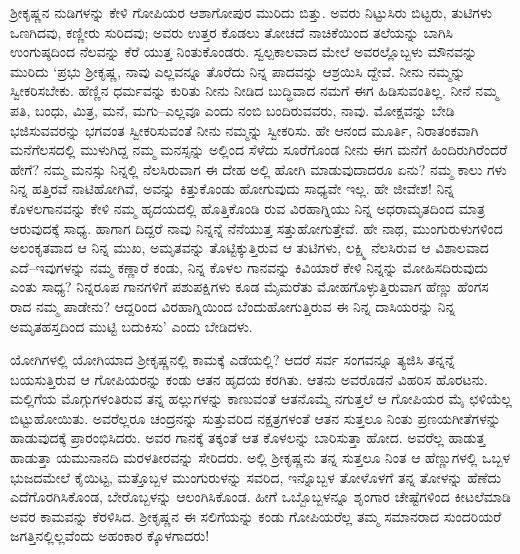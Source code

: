 ಶ್ರೀಕೃಷ್ಣನ ನುಡಿಗಳನ್ನು ಕೇಳಿ ಗೋಪಿಯರ ಆಶಾಗೋಪುರ ಮುರಿದು ಬಿತ್ತು. ಅವರು ನಿಟ್ಟುಸಿರು ಬಿಟ್ಟರು, ತುಟಿಗಳು ಒಣಗಿದವು, ಕಣ್ಣೀರು ಸುರಿದವು; ಅವರು ಉತ್ತರ ಕೊಡಲು ತೋಚದೆ ನಾಚಿಕೆಯಿಂದ ತಲೆಯನ್ನು ಬಾಗಿಸಿ ಉಂಗುಷ್ಠದಿಂದ ನೆಲವನ್ನು ಕೆರೆ ಯುತ್ತ ನಿಂತುಕೊಂಡರು. ಸ್ವಲ್ಪಕಾಲವಾದ ಮೇಲೆ ಅವರಲ್ಲೊಬ್ಬಳು ಮೌನವನ್ನು ಮುರಿದು ‘ಪ್ರಭು ಶ್ರೀಕೃಷ್ಣ, ನಾವು ಎಲ್ಲವನ್ನೂ ತೊರೆದು ನಿನ್ನ ಪಾದವನ್ನು ಆಶ್ರಯಿಸಿ ದ್ದೇವೆ. ನೀನು ನಮ್ಮನ್ನು ಸ್ವೀಕರಿಸಬೇಕು. ಹೆಣ್ಣಿನ ಧರ್ಮವನ್ನು ಕುರಿತು ನೀನು ನೀಡಿದ ಬುದ್ಧಿವಾದ ನಮಗೆ ಈಗ ಹಿಡಿಸುವಂತಿಲ್ಲ. ನೀನೆ ನಮ್ಮ ಪತಿ, ಬಂಧು, ಮಿತ್ರ, ಮನೆ, ಮಗು–ಎಲ್ಲವೂ ಎಂದು ನಂಬಿ ಬಂದಿರುವವರು, ನಾವು. ಮೋಕ್ಷವನ್ನು ಬೇಡಿ ಭಜಿಸುವವರನ್ನು ಭಗವಂತ ಸ್ವೀಕರಿಸುವಂತೆ ನೀನು ನಮ್ಮನ್ನು ಸ್ವೀಕರಿಸು. ಹೇ ಆನಂದ ಮೂರ್ತಿ, ನಿರಾತಂಕವಾಗಿ ಮನೆಗೆಲಸದಲ್ಲಿ ಮುಳುಗಿದ್ದ ನಮ್ಮ ಮನಸ್ಸನ್ನು ಅಲ್ಲಿಂದ ಸೆಳೆದು ಸೂರೆಗೊಂಡ ನೀನು ಈಗ ಮನೆಗೆ ಹಿಂದಿರುಗಿರೆಂದರೆ ಹೇಗೆ? ನಮ್ಮ ಮನಸ್ಸು ನಿನ್ನಲ್ಲಿ ನೆಲಸಿರುವಾಗ ಈ ದೇಹ ಅಲ್ಲಿ ಹೋಗಿ ಮಾಡುವುದಾದರೂ ಏನು? ನಮ್ಮ ಕಾಲು ಗಳು ನಿನ್ನ ಹತ್ತಿರವೆ ನಾಟಿಹೋಗಿವೆ, ಅವನ್ನು ಕಿತ್ತುಕೊಂಡು ಹೋಗುವುದು ಸಾಧ್ಯವೇ ಇಲ್ಲ. ಹೇ ಜೀವೇಶ! ನಿನ್ನ ಕೊಳಲಗಾನವನ್ನು ಕೇಳಿ ನಮ್ಮ ಹೃದಯದಲ್ಲಿ ಹೊತ್ತಿಕೊಂಡಿ ರುವ ವಿರಹಾಗ್ನಿಯು ನಿನ್ನ ಅಧರಾಮೃತದಿಂದ ಮಾತ್ರ ಆರುವುದಕ್ಕೆ ಸಾಧ್ಯ. ಹಾಗಾಗ ದಿದ್ದರೆ ನಾವು ನಿನ್ನನ್ನೆ ನೆನೆಯುತ್ತ ಸತ್ತುಹೋಗುತ್ತೇವೆ. ಹೇ ನಾಥ, ಮುಂಗುರುಳುಗಳಿಂದ ಅಲಂಕೃತವಾದ ಆ ನಿನ್ನ ಮುಖ, ಅಮೃತವನ್ನು ತೊಟ್ಟಿಕ್ಕುತ್ತಿರುವ ಆ ತುಟಿಗಳು, ಲಕ್ಷ್ಮಿ ನೆಲಸಿರುವ ಆ ವಿಶಾಲವಾದ ಎದೆ–ಇವುಗಳನ್ನು ನಮ್ಮ ಕಣ್ಣಾರೆ ಕಂಡು, ನಿನ್ನ ಕೊಳಲ ಗಾನವನ್ನು ಕಿವಿಯಾರೆ ಕೇಳಿ ನಿನ್ನನ್ನು ಮೋಹಿಸದಿರುವುದು ಎಂತು ಸಾಧ್ಯ? ನಿನ್ನರೂಪ ಗಾನಗಳಿಗೆ ಪಶುಪಕ್ಷಿಗಳು ಕೂಡ ಮೈಮರೆತು ಮೋಹಗೊಳ್ಳುತ್ತಿರುವಾಗ ಹೆಣ್ಣು ಹೆಂಗಸ ರಾದ ನಮ್ಮ ಪಾಡೇನು? ಆದ್ದರಿಂದ ವಿರಹಾಗ್ನಿಯಿಂದ ಬೆಂದುಹೋಗುತ್ತಿರುವ ಈ ನಿನ್ನ ದಾಸಿಯರನ್ನು ನಿನ್ನ ಅಮೃತಹಸ್ತದಿಂದ ಮುಟ್ಟಿ ಬದುಕಿಸು’ ಎಂದು ಬೇಡಿದಳು.

ಯೋಗಿಗಳಲ್ಲಿ ಯೋಗಿಯಾದ ಶ್ರೀಕೃಷ್ಣನಲ್ಲಿ ಕಾಮಕ್ಕೆ ಎಡೆಯಲ್ಲಿ? ಆದರೆ ಸರ್ವ ಸಂಗವನ್ನೂ ತ್ಯಜಿಸಿ ತನ್ನನ್ನೆ ಬಯಸುತ್ತಿರುವ ಆ ಗೋಪಿಯರನ್ನು ಕಂಡು ಆತನ ಹೃದಯ ಕರಗಿತು. ಆತನು ಅವರೊಡನೆ ವಿಹರಿಸ ಹೊರಟನು. ಮಲ್ಲಿಗೆಯ ಮೊಗ್ಗುಗಳಂತಿರುವ ತನ್ನ ಹಲ್ಲುಗಳನ್ನು ಕಾಣುವಂತೆ ಆತನೊಮ್ಮೆ ನಗುತ್ತಲೆ ಆ ಗೋಪಿಯರ ಮೈ ಛಳಿಯೆಲ್ಲ ಬಿಟ್ಟುಹೋಯಿತು. ಅವರೆಲ್ಲರೂ ಚಂದ್ರನನ್ನು ಸುತ್ತುವರಿದ ನಕ್ಷತ್ರಗಳಂತೆ ಆತನ ಸುತ್ತಲೂ ನಿಂತು ಪ್ರಣಯಗೀತೆಗಳನ್ನು ಹಾಡುವುದಕ್ಕೆ ಪ್ರಾರಂಭಿಸಿದರು. ಅವರ ಗಾನಕ್ಕೆ ತಕ್ಕಂತೆ ಆತ ಕೊಳಲನ್ನು ಬಾರಿಸುತ್ತಾ ಹೋದ. ಅವರೆಲ್ಲ ಹಾಡುತ್ತ ಹಾಡುತ್ತಾ ಯಮುನಾನದಿ ಮರಳತೀರವನ್ನು ಸೇರಿದರು. ಅಲ್ಲಿ ಶ್ರೀಕೃಷ್ಣನು ತನ್ನ ಸುತ್ತಲೂ ನಿಂತ ಆ ಹೆಣ್ಣುಗಳಲ್ಲಿ ಒಬ್ಬಳ ಭುಜದಮೇಲೆ ಕೈಯಿಟ್ಟ, ಮತ್ತೊಬ್ಬಳ ಮುಂಗುರುಳನ್ನು ಸವರಿದ, ಇನ್ನೊಬ್ಬಳ ತೋಳೊಳಗೆ ತನ್ನ ತೋಳನ್ನು ಹೆಣೆದು ಎದೆಗೊರಗಿಸಿಕೊಂಡ, ಬೇರೊಬ್ಬಳನ್ನು ಆಲಂಗಿಸಿಕೊಂಡ. ಹೀಗೆ ಒಬ್ಬೊಬ್ಬಳನ್ನೂ ಶೃಂಗಾರ ಚೇಷ್ಟೆಗಳಿಂದ ಕೀಟಲೆಮಾಡಿ ಅವರ ಕಾಮವನ್ನು ಕೆರಳಿಸಿದ. ಶ್ರೀಕೃಷ್ಣನ ಈ ಸಲಿಗೆಯನ್ನು ಕಂಡು ಗೋಪಿಯರೆಲ್ಲ ತಮ್ಮ ಸಮಾನರಾದ ಸುಂದರಿಯರೆ ಜಗತ್ತಿನಲ್ಲಿಲ್ಲವೆಂದು ಅಹಂಕಾರ ಕ್ಕೊಳಗಾದರು!

